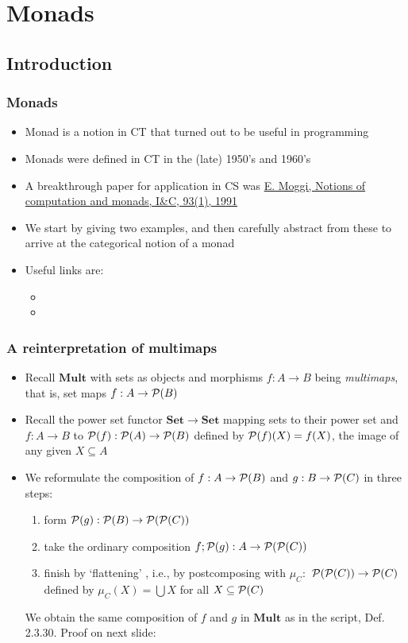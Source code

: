\documentclass[handout]{beamer}
\title[INF223 presentations]{}
\newcommand{\bfsf}[1]{{\boldsymbol{#1}}}
\newcommand{\Set}{\bfsf{Set}}
\newcommand{\Mult}{\bfsf{Mult}}
\begin{document}
\section{Monads}
\subsection{Introduction}
 
\frame
  {   
    \frametitle{Monads}\label{Mon5:Intro}

 \begin{itemize}[<+->]
\item Monad is a notion in CT that turned out to be useful in programming
\item Monads were defined in CT in the (late) 1950's and 1960's
\item A breakthrough paper for application in CS was 
\href{https://person.dibris.unige.it/moggi-eugenio/ftp/ic91.pdf}{\color{blue}E. Moggi, Notions of computation and monads, I\&C, 93(1), 1991}
\item We start by giving two examples, and then carefully abstract from 
these to arrive at the categorical notion of a monad
\item Useful links are:
 \begin{itemize}
    \item {}
    \item {}
 \end{itemize}
 \end{itemize}

 }

\frame
  {   
    \frametitle{A reinterpretation of multimaps}\label{Mon5:MultiMapReint}

 \begin{itemize}[<+->]
\item Recall $\Mult$ with sets as objects and morphisms $f:A\to B$ being
\emph{multimaps}, that is, set maps $f: A\to \operatorname{\mathcal{P}}(B)$
\item Recall the power set functor $\Set\to\Set$ mapping sets to their power set
and $f:A\to B$  to $\operatorname{\mathcal{P}}(f) : \operatorname{\mathcal{P}}(A) \to \operatorname{\mathcal{P}}(B)$ defined by $\operatorname{\mathcal{P}}(f)(X) = f(X)$, the {\color{red}image} of any given $X\subseteq A$
\item We reformulate the composition of $f:A\to \operatorname{\mathcal{P}}(B)$ and $g:B\to \operatorname{\mathcal{P}}(C)$
in three steps:
 \begin{enumerate}
    \item form $\operatorname{\mathcal{P}}(g) : \operatorname{\mathcal{P}}(B) \to \operatorname{\mathcal{P}}(\operatorname{\mathcal{P}}(C))$
    \item take the ordinary composition $f;\operatorname{\mathcal{P}}(g) : A \to \operatorname{\mathcal{P}}(\operatorname{\mathcal{P}}(C))$
    \item finish by `flattening' , i.e., by postcomposing with 
$\mu_C:$ $\operatorname{\mathcal{P}}(\operatorname{\mathcal{P}}(C)) \to \operatorname{\mathcal{P}}(C) $ defined by 
$\mu_C(X) = \bigcup X$ for all $X\subseteq\operatorname{\mathcal{P}}(C)$
 \end{enumerate}
We obtain the same composition of $f$ and $g$ in $\Mult$ as in the script, Def. 2.3.30.
Proof on next slide:
 \end{itemize}

 }
\end{document}
